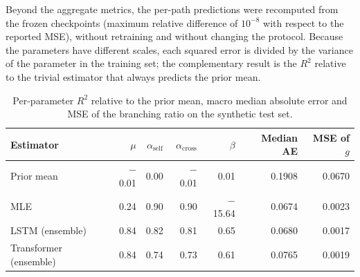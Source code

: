 \label{sec:posthoc}

Beyond the aggregate metrics, the per-path predictions were recomputed from the
frozen checkpoints
(maximum relative difference of $10^{-8}$ with respect to the reported MSE),
without retraining and without changing the protocol. Because the parameters
have different scales, each squared error is divided by the variance of the
parameter in the training set; the complementary result is the $R^2$ relative
to the trivial estimator that always predicts the prior mean.

\begin{table}[htbp]
\centering
\caption{Per-parameter $R^2$ relative to the prior mean, macro median
absolute error and MSE of the branching ratio on the synthetic test set.}
\label{tab:posthoc-r2}
\small
\begin{tabular}{lrrrrrr}
\toprule
Estimator & $\mu$ & $\alpha_{\mathrm{self}}$ & $\alpha_{\mathrm{cross}}$ & $\beta$ & Median AE & MSE of $g$\\
\midrule
Prior mean & $-$0.01 & 0.00 & $-$0.01 & 0.01 & 0.1908 & 0.0670\\
MLE & 0.24 & 0.90 & 0.90 & $-$15.64 & 0.0674 & 0.0023\\
LSTM (ensemble) & 0.84 & 0.82 & 0.81 & 0.65 & 0.0680 & 0.0017\\
Transformer (ensemble) & 0.84 & 0.74 & 0.73 & 0.61 & 0.0765 & 0.0019\\
\bottomrule
\end{tabular}
\end{table}

